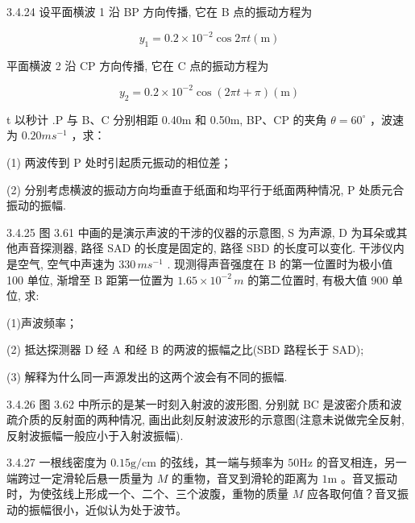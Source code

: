 \begin{problem}{3.4.24}
设平面横波 1 沿 BP 方向传播, 它在 B 点的振动方程为

\[
y _ {1} = 0. 2 \times 1 0 ^ {- 2} \cos 2 \pi t (\mathrm{m})
\]

平面横波 2 沿 CP 方向传播, 它在 C 点的振动方程为

\[
y _ {2} = 0. 2 \times 1 0 ^ {- 2} \cos (2 \pi t + \pi) (\mathrm{m})
\]

t 以秒计 .P 与 B、C 分别相距 0.40m 和 0.50m, BP、CP 的夹角 $\theta=60^{\circ}$ ，波速为 $0.20ms^{-1}$ ，求：

(1) 两波传到 P 处时引起质元振动的相位差；

(2) 分别考虑横波的振动方向均垂直于纸面和均平行于纸面两种情况, P 处质元合振动的振幅.
\begin{center}

\end{center}
\end{problem}
\clearpage


\begin{problem}{3.4.25}
图 3.61 中画的是演示声波的干涉的仪器的示意图, S 为声源, D 为耳朵或其他声音探测器, 路径 SAD 的长度是固定的, 路径 SBD 的长度可以变化. 干涉仪内是空气, 空气中声速为 $330 \, ms^{-1}$ . 现测得声音强度在 B 的第一位置时为极小值 100 单位, 渐增至 B 距第一位置为 $1.65 \times 10^{-2} \, m$ 的第二位置时, 有极大值 900 单位, 求:

(1)声波频率；

(2) 抵达探测器 D 经 A 和经 B 的两波的振幅之比(SBD 路程长于 SAD);

(3) 解释为什么同一声源发出的这两个波会有不同的振幅.
\begin{center}

\end{center}
\end{problem}
\clearpage


\begin{problem}{3.4.26}
图 3.62 中所示的是某一时刻入射波的波形图, 分别就 BC 是波密介质和波疏介质的反射面的两种情况, 画出此刻反射波波形的示意图(注意未说做完全反射, 反射波振幅一般应小于入射波振幅).
\begin{center}

\end{center}
\end{problem}
\clearpage


\begin{problem}{3.4.27}
一根线密度为 $0.15\mathrm{g / cm}$ 的弦线，其一端与频率为 $50\mathrm{Hz}$ 的音叉相连，另一端跨过一定滑轮后悬一质量为 $M$ 的重物，音叉到滑轮的距离为 $1\mathrm{m}$ 。音叉振动时，为使弦线上形成一个、二个、三个波腹，重物的质量 $M$ 应各取何值？音叉振动的振幅很小，近似认为处于波节。
\end{problem}
\clearpage


